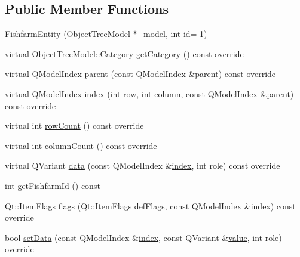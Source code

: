 \subsection*{Public Member Functions}
\begin{DoxyCompactItemize}
\item 
\mbox{\hyperlink{classobjecttree_1_1_fishfarm_entity_abf0ac49ff929ea830297b97ce693524d}{Fishfarm\+Entity}} (\mbox{\hyperlink{class_object_tree_model}{Object\+Tree\+Model}} $\ast$\+\_\+model, int id=-\/1)
\item 
virtual \mbox{\hyperlink{class_object_tree_model_a379e9d6b0d381853785adf62095ba4e3}{Object\+Tree\+Model\+::\+Category}} \mbox{\hyperlink{classobjecttree_1_1_fishfarm_entity_a7bac8507c6e43f4647780efe6cbad68b}{get\+Category}} () const override
\item 
virtual Q\+Model\+Index \mbox{\hyperlink{classobjecttree_1_1_fishfarm_entity_aac4d7a77c41deb65f4521647789a689d}{parent}} (const Q\+Model\+Index \&parent) const override
\item 
virtual Q\+Model\+Index \mbox{\hyperlink{classobjecttree_1_1_fishfarm_entity_a798031bca853586ff538fa667609fb83}{index}} (int row, int column, const Q\+Model\+Index \&\mbox{\hyperlink{classobjecttree_1_1_fishfarm_entity_aac4d7a77c41deb65f4521647789a689d}{parent}}) const override
\item 
virtual int \mbox{\hyperlink{classobjecttree_1_1_fishfarm_entity_afa62dcf3a29d5e9f1125e958196878aa}{row\+Count}} () const override
\item 
virtual int \mbox{\hyperlink{classobjecttree_1_1_fishfarm_entity_abdf6e1d8d17681f4400594fa97d0ee98}{column\+Count}} () const override
\item 
virtual Q\+Variant \mbox{\hyperlink{classobjecttree_1_1_fishfarm_entity_aacaf463406fb39561982ff90c68d9e75}{data}} (const Q\+Model\+Index \&\mbox{\hyperlink{classobjecttree_1_1_fishfarm_entity_a798031bca853586ff538fa667609fb83}{index}}, int role) const override
\item 
int \mbox{\hyperlink{classobjecttree_1_1_fishfarm_entity_a4c087337758c6dec9c9f1363aa6897f0}{get\+Fishfarm\+Id}} () const
\item 
Qt\+::\+Item\+Flags \mbox{\hyperlink{classobjecttree_1_1_fishfarm_entity_ac474b5816c70facd1ea6da26b0678b91}{flags}} (Qt\+::\+Item\+Flags def\+Flags, const Q\+Model\+Index \&\mbox{\hyperlink{classobjecttree_1_1_fishfarm_entity_a798031bca853586ff538fa667609fb83}{index}}) const override
\item 
bool \mbox{\hyperlink{classobjecttree_1_1_fishfarm_entity_a8b3b7c802ae6f0bd79aacbb03b7d1f47}{set\+Data}} (const Q\+Model\+Index \&\mbox{\hyperlink{classobjecttree_1_1_fishfarm_entity_a798031bca853586ff538fa667609fb83}{index}}, const Q\+Variant \&\mbox{\hyperlink{diffusion_8cpp_a4b41795815d9f3d03abfc739e666d5da}{value}}, int role) override
\end{DoxyCompactItemize}
